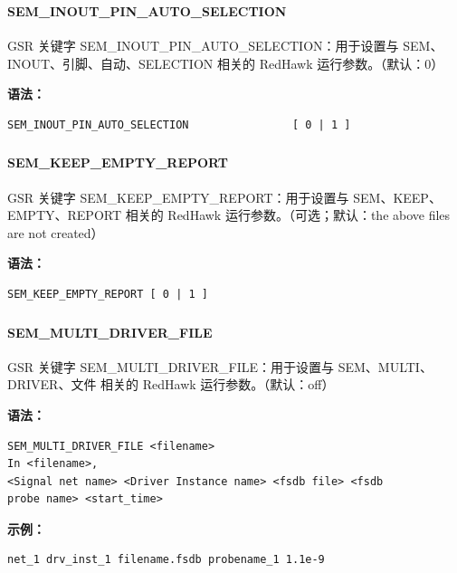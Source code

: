 \subsubsection{}
\paragraph*{SEM_INOUT_PIN_AUTO_SELECTION}

GSR 关键字 SEM_INOUT_PIN_AUTO_SELECTION：用于设置与 SEM、INOUT、引脚、自动、SELECTION 相关的 RedHawk 运行参数。（默认：0）

\textbf{语法：}
\begin{lstlisting}
SEM_INOUT_PIN_AUTO_SELECTION                [ 0 | 1 ]
\end{lstlisting}

\subsubsection{}
\paragraph*{SEM_KEEP_EMPTY_REPORT}

GSR 关键字 SEM_KEEP_EMPTY_REPORT：用于设置与 SEM、KEEP、EMPTY、REPORT 相关的 RedHawk 运行参数。（可选；默认：the above files are not created）

\textbf{语法：}
\begin{lstlisting}
SEM_KEEP_EMPTY_REPORT [ 0 | 1 ]
\end{lstlisting}

\subsubsection{}
\paragraph*{SEM_MULTI_DRIVER_FILE}

GSR 关键字 SEM_MULTI_DRIVER_FILE：用于设置与 SEM、MULTI、DRIVER、文件 相关的 RedHawk 运行参数。（默认：off）

\textbf{语法：}
\begin{lstlisting}
SEM_MULTI_DRIVER_FILE <filename>
In <filename>,
<Signal net name> <Driver Instance name> <fsdb file> <fsdb
probe name> <start_time>
\end{lstlisting}

\textbf{示例：}
\begin{lstlisting}
net_1 drv_inst_1 filename.fsdb probename_1 1.1e-9
\end{lstlisting}

